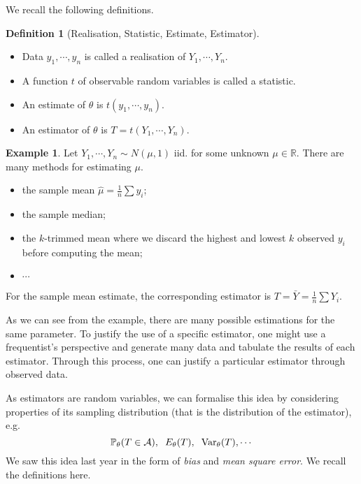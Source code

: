 \documentclass[
]{article}
\theoremstyle{definition}
\newtheorem{example}{Example}
\theoremstyle{definition}
\newtheorem{definition}{Definition}[section]
\begin{document}
We recall the following definitions.

\begin{definition}[Realisation, Statistic, Estimate, Estimator]
~
\begin{itemize}
  \item Data \(y_1, \cdots, y_n\) is called a realisation of \(Y_1, \cdots, Y_n\).
  \item A function \(t\) of observable random variables is called a statistic.
  \item An estimate of \(\theta\) is \(t(y_1, \cdots, y_n)\).
  \item An estimator of \(\theta\) is \(T = t(Y_1, \cdots, Y_n)\).
\end{itemize}
\end{definition}

\begin{example}
  Let \(Y_1, \cdots, Y_n \sim N(\mu, 1)\) iid. for some unknown \(\mu \in \mathbb{R}\).
  There are many methods for estimating \(\mu\). 
  \begin{itemize}
    \item the sample mean \(\hat{\mu} = \frac{1}{n} \sum y_i\);
    \item the sample median;
    \item the \(k\)-trimmed mean where we discard the highest and lowest \(k\) observed \(y_i\)
      before computing the mean;
    \item \(\cdots\) 
  \end{itemize}
  For the sample mean estimate, the corresponding estimator is 
  \(T = \bar{Y} = \frac{1}{n}\sum Y_i\).
\end{example}

As we can see from the example, there are many possible estimations for
the same parameter. To justify the use of a specific estimator, one
might use a frequentist's perspective and generate many data and
tabulate the results of each estimator. Through this process, one can
justify a particular estimator through observed data.

As estimators are random variables, we can formalise this idea by
considering properties of its sampling distribution (that is the
distribution of the estimator), e.g.~
\[\mathbb{P}_\theta(T \in \mathcal{A}), \hspace{2mm} E_\theta(T), \hspace{2mm} {\mathop{\mathrm{Var}}}_\theta(T), \cdots\]
We saw this idea last year in the form of \emph{bias} and \emph{mean
square error}. We recall the definitions here.
\end{document}
